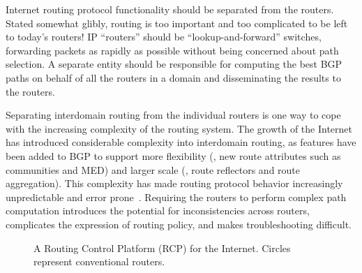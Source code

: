 



Internet routing protocol
functionality should be separated from the routers.  Stated somewhat glibly,
routing is too important and too complicated to be
left to today's routers!  IP ``routers'' should be
``lookup-and-forward'' switches, forwarding packets as rapidly as
possible without being concerned about path selection.  
A separate entity should be responsible for 
computing the best BGP paths on behalf 
of all the routers in a domain and disseminating the results to the
routers. 




Separating interdomain routing from the individual routers is one way to
cope with the increasing complexity of the routing system.
The growth of the Internet has introduced considerable complexity into
interdomain routing, as  
features have been added to BGP to support
more flexibility (\eg, new route attributes such as communities and
MED) and larger scale (\eg, route reflectors and route aggregation).
This complexity has made routing protocol
behavior increasingly unpredictable and error prone~\cite{Feamster2004h}.
Requiring the 
routers to perform complex path computation introduces the potential
for inconsistencies across routers, complicates the expression of
routing policy, and makes troubleshooting difficult.


\begin{figure}[t]
\centering{}
\caption[A Routing Control Platform (RCP) for the Internet.]{A Routing
Control Platform (RCP) for the Internet.  Circles 
  represent conventional routers.}
\label{fig:interas}
\end{figure}

